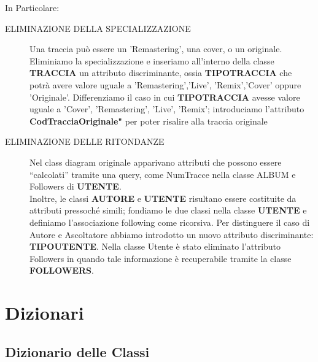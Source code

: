 \documentclass[11pt]{article}
\begin{document}
	In Particolare:\\
	\begin{description}
		
		\item[ELIMINAZIONE DELLA SPECIALIZZAZIONE]
		Una traccia può essere un 'Remastering', una cover, o un originale. 
		Eliminiamo la specializzazione e inseriamo all’interno della classe \textbf{TRACCIA} un attributo discriminante, 
		ossia \textbf{TIPOTRACCIA} che potrà avere valore uguale a 'Remastering','Live', 'Remix','Cover' oppure 'Originale'.
		Differenziamo il caso in cui \textbf{TIPOTRACCIA} avesse valore uguale a 'Cover', 'Remastering', 'Live', 'Remix';
		introduciamo l’attributo \textbf{CodTracciaOriginale"} per poter risalire alla traccia originale\\
		\item[ELIMINAZIONE DELLE RITONDANZE]
		Nel class diagram originale apparivano attributi che possono essere “calcolati” tramite una query, come NumTracce nella classe ALBUM e Followers di \textbf{UTENTE}.\\
		Inoltre, le classi \textbf{AUTORE} e \textbf{UTENTE} risultano essere costituite da attributi pressoché simili;
		fondiamo le due classi nella classe \textbf{UTENTE} e definiamo l’associazione following come ricorsiva.
		Per distinguere il caso di Autore e Ascoltatore abbiamo introdotto un nuovo attributo discriminante: \textbf{TIPOUTENTE}.
		Nella classe Utente è stato eliminato l’attributo Followers in quando tale informazione è recuperabile tramite la classe \textbf{FOLLOWERS}.\\
	\end{description}

	\clearpage

	\section{Dizionari}
	\subsection{Dizionario delle Classi}
\end{document}
